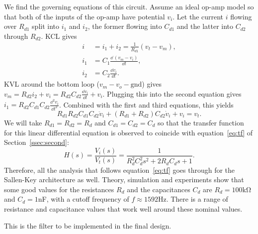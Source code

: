 We find the governing equations of this circuit. Assume an ideal op-amp model so
that both of the inputs of the op-amp have potential $v_i$. Let the current $i$
flowing over $R_{d1}$ split into $i_1$ and $i_2$, the former flowing into
$C_{d1}$ and the latter into $C_{d2}$ through $R_{d2}$. KCL gives
%
\vspace{-1em}
\begin{align*}
    i &= i_1 + i_2 = \frac{1}{R_{d1}}(v_t - v_m), \\
    i_1 &= C_1 \frac{\dd\, (v_m - v_i)}{\dd t}, \\
    i_2 &= C_2 \frac{\dd v_i}{\dd t}.
\end{align*}
%
KVL around the bottom loop ($v_m - v_o - \text{gnd}$) gives $v_m = R_{d2}i_2 +
v_i = R_{d2}C_{d2}\frac{\dd v_i}{\dd t} + v_i$. Plugging this into the second
equation gives $i_1 = R_{d2}C_{d1}C_{d2}\frac{\dd^2v_i}{\dd t^2}$. Combined with
the first and third equations, this yields
%
\begin{equation}
    R_{d1}R_{d2}C_{d1}C_{d2}\ddot{v}_i + (R_{d1} + R_{d2})C_{d2}\dot{v}_i + v_i
    = v_t.
    \label{eq:sallenkey_de}
\end{equation}
%
We will take $R_{d1} = R_{d2} = R_d$ and $C_{d1} = C_{d2} = C_d$ so that the
transfer function for this linear differential equation is observed to coincide
with equation~\eqref{eq:tf} of Section~\ref{ssec:second}: \[ H(s) =
\frac{V_i(s)}{V_t(s)} = \frac{1}{R_d^2C_d^2s^2 + 2R_dC_ds + 1}.\]
%
Therefore, all the analysis that follows equation~\eqref{eq:tf} goes through for
the Sallen-Key architecture as well. Theory, simulation and experiments show
that some good values for the resistances $R_d$ and the capacitances $C_d$ are
$R_d = 100$\unit{\kilo\ohm} and $C_d = 1$\unit{\nano\farad}, with a cutoff
frequency of $f \approx 1592$\unit{\hertz}. There is a range of resistance and
capacitance values that work well around these nominal values.

\begin{rem}
    This is the filter to be implemented in the final design.
\end{rem}
